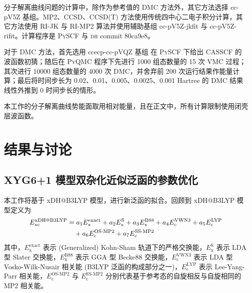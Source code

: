 分子解离曲线问题的计算中，除作为参考值的 DMC 方法外，其它方法选择 cc-pV5Z 基组\cite{Dunning-Dunning.JCP.1989}。MP2、CCSD、CCSD(T) 方法使用传统四中心二电子积分计算，其它方法使用 RI-JK 与 RI-MP2 算法并使用辅助基组 cc-pV5Z-jkfit\cite{Weigend-Weigend.PCCP.2002} 与 cc-pV5Z-rifit\cite{10.1039/b415208e}。计算程序是 \textsc{PySCF} 与 \textsc{dh} commit 80ca9e8。

对于 DMC 方法，首先选用 ccecp-cc-pVQZ 基组\cite{Bennett-Mitas.JCP.2017} 在 \textsc{PySCF} 下给出 CASSCF 的波函数初猜；随后在 \textsc{PyQMC} 程序\cite{Wheeler-Wagner.JCP.2023}下先进行 1000 组态数量的 15 次 VMC 过程；其次进行 10000 组态数量的 4000 次 DMC，并舍弃前 200 次运行结果作能量计算；最后将时间步长为 0.02、0.01、0.005、0.0025、0.001 Hartree 的 DMC 结果线性外推到 0 时间步长的情形。

本工作的分子解离曲线势能面取用相对能量，且在正文中，所有计算限制使用闭壳层波函数。

\section{结果与讨论}
\label{sec.2.iepa-results}

\subsection{XYG6+1 模型双杂化近似泛函的参数优化}

本工作将基于 xDH@B3LYP 模型\cite{Zhang-Xu.JPCL.2021}，进行新泛函的拟合。回顾到 xDH@B3LYP 模型定义为
\begin{align}
  E_\mathrm{xc}^\text{xDH@B3LYP} &= a_1 E_\mathrm{x}^\mathrm{exact} + a_2 E_\mathrm{x}^\mathrm{S} + a_3 E_\mathrm{x}^\mathrm{B88} + a_4 E_\mathrm{c}^\mathrm{VWN3} + a_5 E_\mathrm{c}^\mathrm{LYP} \notag \\
  &\quad + a_6 E_\mathrm{c}^\text{OS-MP2} + a_7 E_\mathrm{c}^\text{SS-MP2}
\end{align}
其中，$E_\mathrm{x}^\mathrm{exact}$ 表示 (Generalized) Kohn-Sham 轨道下的严格交换能，$E_\mathrm{x}^\mathrm{S}$ 表示 LDA 型 Slater 交换能\cite{Bloch-Bloch.ZP.1929,Dirac-Dirac.MPCPS.1930}，$E_\mathrm{x}^\mathrm{B88}$ 表示 GGA 型 Becke88 交换能\cite{Becke-Becke.PRA.1988}，$E_\mathrm{c}^\mathrm{VWN3}$ 表示 LDA 型 Vosko-Wilk-Nusair 相关能\cite{Vosko-Nusair.CJP.1980} (B3LYP 泛函的构成部分之一\cite{Becke-Becke.JCP.1993,Stephens-Frisch.JPC.1994})，$E_\mathrm{c}^\mathrm{LYP}$ 表示 Lee-Yang-Parr 相关能\cite{Lee-Parr.PRB.1988}，$E_\mathrm{c}^\text{OS-MP2}$ 与 $E_\mathrm{c}^\text{SS-MP2}$ 分别代表基于参考态的自旋相反与自旋相同的 MP2 相关能。

